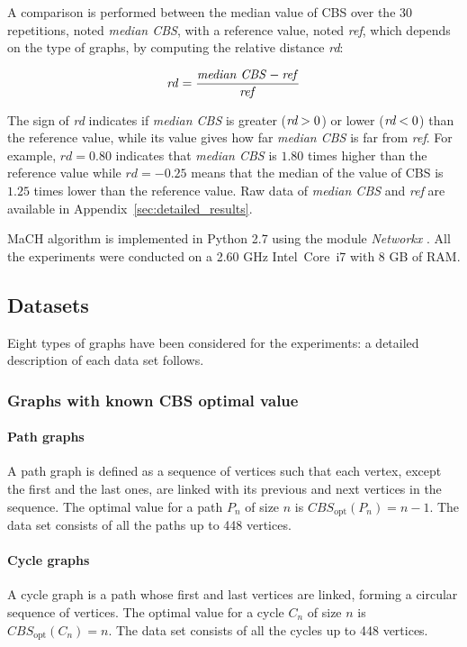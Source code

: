 \documentclass{scrartcl}
\theoremstyle{plain}
\newcommand{\algo}{MaCH}
\newcommand{\cbs}{CBS}
\begin{document}
A comparison is performed between the median value of \cbs{} over the $30$ 
repetitions, noted \emph{median \cbs{}}, with a reference value, noted 
\emph{ref}, which depends on the type of graphs, by computing the relative 
distance \emph{rd}:

\begin{align} 
\text{\emph{rd}} = \frac{\text{\emph{median \cbs{}}} - 
\text{\emph{ref}}}{\text{\emph{ref}}} 
\end{align} 

The sign of \emph{rd} indicates if \emph{median \cbs{}} is greater ($\emph{rd} > 
0$) or lower ($\emph{rd} < 0$) than the reference value, while its value gives 
how far \emph{median \cbs{}} is far from \emph{ref}. For example, $rd=0.80$ 
indicates that \emph{median \cbs{}} is $1.80$ times higher than the reference 
value while $rd=-0.25$ means that the median of the value of \cbs{} is $1.25$ 
times lower than the reference value. Raw data of \emph{median \cbs{}} and 
\emph{ref} are available in Appendix~\ref{sec:detailed_results}.

\algo{} algorithm is implemented in Python 2.7 using the module \emph{Networkx} 
\cite{Hagberg2008}. All the experiments were conducted on a 2.60 GHz 
Intel~Core~i7  with 8 GB of RAM.



\subsection{Datasets}

Eight types of graphs have been considered for the experiments: a detailed 
description of each data set follows.

\subsubsection{Graphs with known \cbs{} optimal value}

\paragraph{\textbf{Path graphs}}
A path graph is defined as a sequence of vertices such that each vertex, except 
the first and the last ones, are linked with its previous and next vertices in 
the sequence. The optimal value for a path $P_n$ of size $n$ is 
$\cbs{}_{\text{opt}}(P_n) = n-1$. The data set consists of all the paths up to 
448 vertices.

\paragraph{\textbf{Cycle graphs}}
A cycle graph is a path whose first and last vertices are linked, 
forming a circular sequence of vertices. The optimal value for a cycle $C_n$ of 
size $n$ is $\cbs{}_{\text{opt}}(C_n) = n$. The data set consists of all the 
cycles up to 448 vertices.
\end{document}
